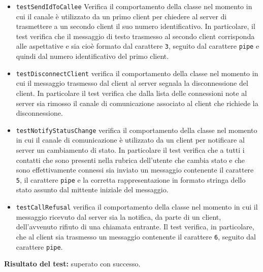 \begin{itemize}
\begin{itemize}
\item \texttt{testSendIdToCallee} Verifica il comportamento della classe nel momento in cui il canale è utilizzato da un primo client per chiedere al server di trasmettere a un secondo client il suo numero identificativo. In particolare, il test verifica che il messaggio di testo trasmesso al secondo client corrisponda alle aspettative e sia cioè formato dal carattere \texttt{3}, seguito dal carattere \texttt{pipe} e quindi dal numero identificativo del primo client.

\item \texttt{testDisconnectClient} verifica il comportamento della classe nel momento in cui il messaggio trasmesso dal client al server segnala la disconnessione del client. In particolare il test verifica che dalla lista delle connessioni note al server sia rimosso il canale di comunicazione associato al client che richiede la disconnessione.

\item \texttt{testNotifyStatusChange} verifica il comportamento della classe nel momento in cui il canale di comunicazione è utilizzato da un client per notificare al server un cambiamento di stato. In particolare il test verifica che a tutti i contatti che sono presenti nella rubrica dell'utente che cambia stato e che sono effettivamente connessi sia inviato un messaggio contenente il carattere \texttt{5}, il carattere \texttt{pipe} e la corretta rappresentazione in formato stringa dello stato assunto dal mittente iniziale del messaggio.

\item \texttt{testCallRefusal} verifica il comportamento della classe nel momento in cui il messaggio  ricevuto dal server sia la notifica, da parte di un client, dell'avvenuto rifiuto di una chiamata entrante. Il test verifica, in particolare, che al client sia trasmesso un messaggio contenente il carattere \texttt{6}, seguito dal carattere \texttt{pipe}.

\end{itemize}
\textbf{Risultato del test:} superato con successo.
\end{itemize}



